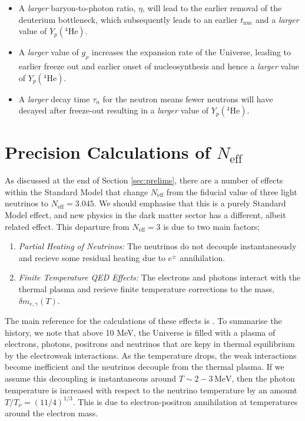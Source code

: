\documentclass[11pt]{article}
\numberwithin{equation}{section}
\numberwithin{figure}{section}
\numberwithin{table}{section}
\begin{document}
\begin{itemize}
\item A \textit{larger} baryon-to-photon ratio, $\eta$, will lead to the earlier removal of the deuterium bottleneck, which subsequently leads to an earlier $t_{\mathrm{nuc}}$ and a \textit{larger} value of $Y_p(^{4}\mathrm{He})$.
\item A \textit{larger} value of $g_\rho$ increases the expansion rate of the Universe, leading to earlier freeze out and earlier onset of nucleosynthesis and hence a \textit{larger} value of $Y_p(^{4}\mathrm{He})$.
\item A \textit{larger} decay time $\tau_n$ for the neutron means fewer neutrons will have decayed after freeze-out resulting in a \textit{larger} value of $Y_p(^{4}\mathrm{He})$.
\end{itemize}


\section{Precision Calculations of $N_{\mathrm{eff}}$} \label{sec:neff}


As discussed at the end of Section \ref{sec:prelims}, there are a number of effects within the Standard Model that change $N_{\mathrm{eff}}$ from the fiducial value of three light neutrinos to $N_{\mathrm{eff}} = 3.045$. We should emphasise that this is a purely Standard Model effect, and new physics in the dark matter sector has a different, albeit related effect. This departure from $N_{\mathrm{eff}} = 3$ is due to two main factors;
\begin{enumerate}
\item \textit{Partial Heating of Neutrinos:} The neutrinos do not decouple instantaneously and recieve some residual heating due to $e^{\pm}$ annihilation.
\item \textit{Finite Temperature QED Effects:} The electrons and photons interact with the thermal plasma and recieve finite temperature corrections to the mass, $\delta m_{e, \gamma}(T)$.
\end{enumerate}
The main reference for the calculations of these effects is \cite{Mangano:2001iu}. To summarise the history, we note that above 10 MeV, the Universe is filled with a plasma of electrons, photons, positrons and neutrinos that are kepy in thermal equilibrium by the electroweak interactions. As the temperature drops, the weak interactions become inefficient and the neutrinos decouple from the thermal plasma. If we assume this decoupling is instantaneous around $T \sim 2 - 3 \, \mathrm{MeV}$, then the photon temperature is increased with respect to the neutrino temperature by an amount $T/T_\nu = (11/4)^{1/3}$. This is due to electron-positron annihilation at temperatures around the electron mass.
\end{document}
